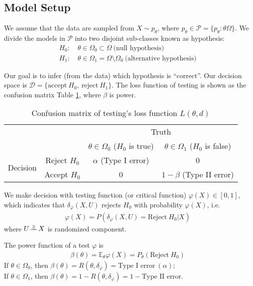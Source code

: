 
\subsection{Model Setup}

We assume that the data are sampled from $X\sim{p_\theta}$,
where $p_\theta\in\mathcal{P}=\{p_\theta:\theta\Omega\}$.
We divide the models in $\mathcal{P}$ into two disjoint sub-classes known as hypothesis:
\begin{align}
    H_0:&~\theta\in\Omega_0\subset{\Omega}~\text{(null hypothesis)}\\
    H_1:&~\theta\in\Omega_1=\Omega\setminus\Omega_0~\text{(alternative hypothesis)}
\end{align}

Our goal is to infer (from the data) which hypothesis is ``correct''.
Our decision space is $\mathcal{D}=\{\text{accept}~H_0,~\text{reject}~H_1\}$.
The loss function of testing is shown as the confusion matrix Table \ref{tab:testconfmtx},
where $\beta$ is power.

\begin{table}[htbp]
  \centering
  \caption{Confusion matrix of testing's loss function $L(\theta,d)$}
    \begin{tabular}{cc|cc}
          &       & \multicolumn{2}{c}{Truth} \\
          &       & $\theta\in\Omega_0$ ($H_0$ is true) & $\theta\in\Omega_1$ ($H_0$ is false) \\
    \midrule
    \multirow{2}[1]{*}{Decision}
          & Reject $H_0$ & $\alpha$ (Type I error) & 0 \\
          & Accept $H_0$ & 0     & $1-\beta$ (Type II error) \\
    \end{tabular}
  \label{tab:testconfmtx}%
\end{table}%

We make decision with testing function (or critical function) $\varphi(X)\in[0,1]$,
which indicates that $\delta_\varphi(X,U)$ rejects $H_0$ with probability $\varphi(X)$, i.e.
\begin{gather}
    \varphi(X)=P(\delta_\varphi(X,U)=\text{Reject}~H_0|X)
\end{gather}
where $U\vperp X$ is randomized component.

\begin{definition}
    The power function of a test $\varphi$ is 
    \begin{gather}
        \beta(\theta)=\mathbb{E}_\theta\varphi(X)=P_\theta(\text{Reject}~H_0)
    \end{gather}
    If $\theta\in\Omega_0$, then $\beta(\theta)=R(\theta,\delta_\varphi)=\text{Type I error}~(\alpha);$\\
    If $\theta\in\Omega_1$, then $\beta(\theta)=1-R(\theta,\delta_\varphi)=1-\text{Type II error}$.
\end{definition}

